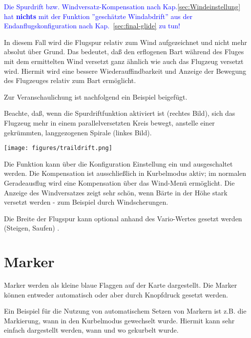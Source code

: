  \textcolor{blue}{ Die Spurdrift bzw. Windversatz-Kompensation nach Kap.\ref{sec:Windeinstellung} hat \textbf{nichts}  mit der Funktion ''geschätzte Windabdrift'' \achtung aus der Endanflugskonfiguration nach Kap.~\ref{sec:final-glide} zu tun!}
 
In diesem Fall wird die Flugspur relativ zum Wind aufgezeichnet und nicht mehr absolut über Grund. Das bedeutet, daß  \xc den erflogenen Bart während des Fluges mit dem ermittelten Wind versetzt ganz ähnlich wie auch das Flugzeug versetzt wird. Hiermit wird eine bessere Wiederauffindbarkeit und  Anzeige der Bewegung des Flugzeuges relativ zum Bart ermöglicht.

Zur Veranschaulichung ist nachfolgend ein Beispiel beigefügt. 

Beachte, daß, wenn die Spurdriftfunktion aktiviert ist (rechtes Bild), sich das Flugzeug mehr in einem parallelversetzten Kreis  bewegt, anstelle einer gekrümmten, langgezogenen Spirale (linkes Bild).

\begin{center}
\texttt{[image: figures/traildrift.png]}
\end{center}

 Die Funktion  kann über die Konfiguration Einstellung ein und ausgeschaltet werden.  Die Kompensation ist ausschließlich in Kurbelmodus aktiv; im normalen Geradeausflug wird eine Kompensation über das Wind-Menü ermöglicht.
Die Anzeige des Windversatzes zeigt sehr schön, wenn Bärte in der Höhe stark versetzt werden - zum Beispiel durch Windscherungen.

Die Breite der Flugspur  kann optional anhand des Vario-Wertes gesetzt werden (Steigen, Saufen) .
\section{Marker}

Marker werden als kleine blaue Flaggen auf der Karte dargestellt. 
Die Marker können entweder automatisch oder aber durch Knopfdruck gesetzt werden.

Ein Beispiel für die Nutzung von automatischem Setzen von Markern ist z.B. die 
Markierung, wann in den Kurbelmodus gewechselt wurde. Hiermit kann sehr einfach dargestellt werden, wann und wo gekurbelt wurde.

